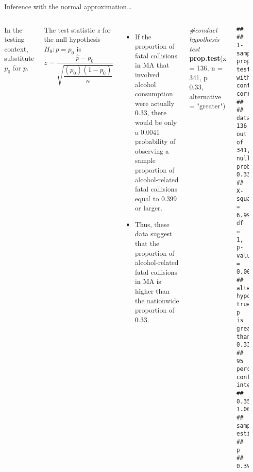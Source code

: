 \documentclass[
  ignorenonframetext,
  aspectratio=169]{beamer}
\newenvironment{Shaded}{\begin{snugshade}}{\end{snugshade}}
\newcommand{\AttributeTok}[1]{\textcolor[rgb]{0.13,0.29,0.53}{#1}}
\newcommand{\CommentTok}[1]{\textcolor[rgb]{0.56,0.35,0.01}{\textit{#1}}}
\newcommand{\DecValTok}[1]{\textcolor[rgb]{0.00,0.00,0.81}{#1}}
\newcommand{\FloatTok}[1]{\textcolor[rgb]{0.00,0.00,0.81}{#1}}
\newcommand{\FunctionTok}[1]{\textcolor[rgb]{0.13,0.29,0.53}{\textbf{#1}}}
\newcommand{\NormalTok}[1]{#1}
\newcommand{\StringTok}[1]{\textcolor[rgb]{0.31,0.60,0.02}{#1}}
\newcommand{\columnsbegin}{\begin{columns}}
\newcommand{\columnsend}{\end{columns}}
\begin{document}
\begin{frame}[fragile]{Inference with the normal approximation\ldots{}}
\protect\hypertarget{inference-with-the-normal-approximation-1}{}
\columnsbegin


\footnotesize

In the testing context, substitute \(p_0\) for \(p\).

\vspace{0.25cm}

The test statistic \(z\) for the null hypothesis \(H_0: p = p_0\) is
\[z = \dfrac{\hat{p} - p_0}{\sqrt{\dfrac{(p_0)(1 - p_0)}{n}}} \]

\begin{itemize}
\item
  If the proportion of fatal collisions in MA that involved alcohol
  consumption were actually 0.33, there would be only a 0.0041
  probability of observing a sample proportion of alcohol-related fatal
  collisions equal to 0.399 or larger.
\item
  Thus, these data suggest that the proportion of alcohol-related fatal
  collisions in MA is higher than the nationwide proportion of 0.33.
\end{itemize}


\scriptsize

\begin{Shaded}
\begin{Highlighting}[]
\CommentTok{\#conduct hypothesis test}
\FunctionTok{prop.test}\NormalTok{(}\AttributeTok{x =} \DecValTok{136}\NormalTok{, }\AttributeTok{n =} \DecValTok{341}\NormalTok{, }\AttributeTok{p =} \FloatTok{0.33}\NormalTok{, }
          \AttributeTok{alternative =} \StringTok{"greater"}\NormalTok{)}
\end{Highlighting}
\end{Shaded}

\begin{verbatim}
## 
##  1-sample proportions test with continuity correction
## 
## data:  136 out of 341, null probability 0.33
## X-squared = 6.9981, df = 1, p-value = 0.00408
## alternative hypothesis: true p is greater than 0.33
## 95 percent confidence interval:
##  0.3547446 1.0000000
## sample estimates:
##        p 
## 0.398827
\end{verbatim}

\columnsend
\end{frame}
\end{document}
